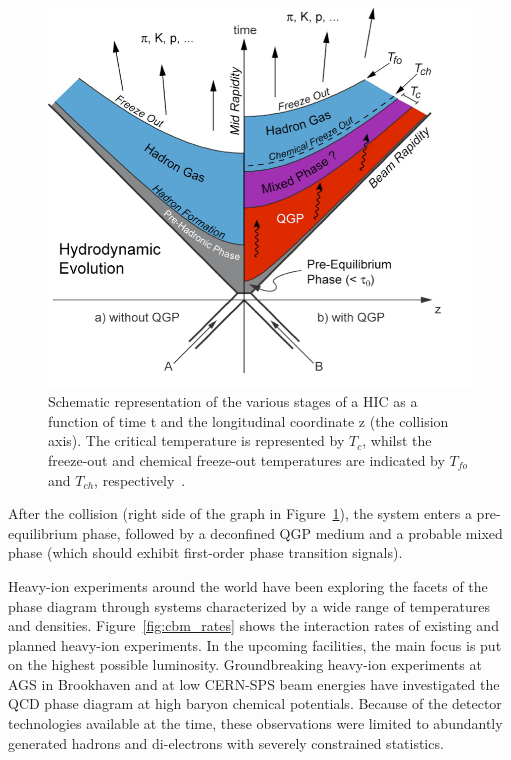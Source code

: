 \begin{figure}[!h]
\centering
 \includegraphics[width=0.55\columnwidth]{Chapter1/images/heavyion.png}
\caption{Schematic representation of the various stages of a HIC as a function of time t and the longitudinal coordinate z (the collision axis). The critical temperature is represented by $T_c$, whilst the freeze-out and chemical freeze-out temperatures are indicated by $T_{fo}$ and $T_{ch}$, respectively~\cite{Sahoo:2745520}.}
\label{fig_heavyion}
\end{figure}
\newpage
 After the collision (right side of the graph in Figure~\ref{fig_heavyion}), the system enters a pre-equilibrium phase, followed by a deconfined QGP medium and a probable mixed phase (which should exhibit first-order phase transition signals).

Heavy-ion experiments around the world have been exploring the facets of the phase diagram through systems characterized by a wide range of temperatures and densities. Figure~\ref{fig:cbm_rates} shows the interaction rates of existing and planned heavy-ion experiments. In the upcoming facilities, the main focus is put on the highest possible luminosity. Groundbreaking heavy-ion experiments at AGS in Brookhaven and at low CERN-SPS beam energies have investigated the QCD phase diagram at high baryon chemical potentials. Because of the detector technologies available at the time, these observations were limited to abundantly generated hadrons and di-electrons with severely constrained statistics.

